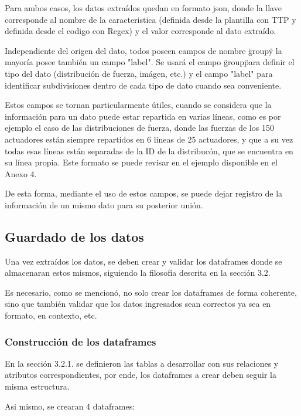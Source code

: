 Para ambos casos, los datos extraídos quedan en formato json, donde la llave corresponde al nombre de la caracteristica (definida desde la plantilla con TTP y definida desde el codigo con Regex) y el valor corresponde al dato extraído.

Independiente del origen del dato, todos poseen campos de nombre \"group\" y la mayoría posee también un campo "label". Se usará el campo \"group\" para definir el tipo del dato (distribución de fuerza, imágen, etc.) y el campo "label" para identificar subdivisiones dentro de cada tipo de dato cuando sea conveniente.

Estos campos se tornan particularmente útiles, cuando se considera que la información para un dato puede estar repartida en varias líneas, como es por ejemplo el caso de las distribuciones de fuerza, donde las fuerzas de los 150 actuadores están siempre repartidos en 6 líneas de 25 actuadores, y que a su vez todas esas líneas están separadas de la ID de la distribucón, que se encuentra en su línea propia. Este formato se puede revisar en el ejemplo disponible en el Anexo 4.

De esta forma, mediante el uso de estos campos, se puede dejar registro de la información de un mismo dato para su posterior unión.

\subsection{Guardado de los datos}

Una vez extraídos los datos, se deben crear y validar los dataframes donde se almacenaran estos mismos, siguiendo la filosofía descrita en la sección 3.2.

Es necesario, como se mencionó, no solo crear los dataframes de forma coherente, sino que también validar que los datos ingresados sean correctos ya sea en formato, en contexto, etc.

\subsubsection{Construcción de los dataframes}

En la sección 3.2.1. se definieron las tablas a desarrollar con sus relaciones y atributos correspondientes, por ende, los dataframes a crear deben seguir la misma estructura.

Asi mismo, se crearan 4 dataframes:

